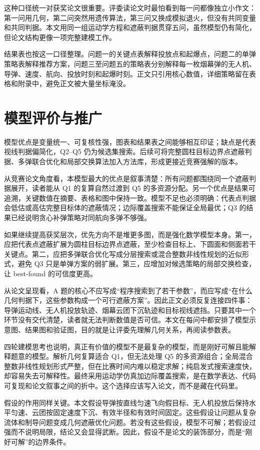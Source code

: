 \documentclass[UTF8,12pt,a4paper]{ctexart}
\begin{document}
这种口径统一对获奖论文很重要。评委读论文时最怕看到每一问都像独立小作文：第一问用几何，第二问突然用遗传算法，第三问又换成模拟退火，但没有共同变量和共同判据。本文用同一组运动学方程和遮蔽判据贯穿五问，虽然模型仍有简化，但论文结构更像一项完整建模工作。

结果表也按这一口径整理。问题一的关键点表解释投放点和起爆点，问题二的单弹策略表解释推荐方案，问题三至问题五的策略表分别解释每一枚烟幕弹的无人机、导弹、速度、航向、投放时刻和起爆时刻。正文只引用核心数值，详细策略留在表格和附录中，避免正文被大量坐标淹没。

\section{模型评价与推广}

模型优点是变量统一、可复核性强，图表和结果表之间能够相互印证；缺点是代表视线判据偏简化，Q2--Q5 仍为候选集搜索。后续可将完整圆柱目标边界点遮蔽判据、多弹联合优化和局部交换算法加入方法库，形成更接近竞赛强解的版本。

从竞赛论文角度看，本模型最大的优点是叙事清楚：所有问题都围绕同一个遮蔽判据展开，读者能从 Q1 的复算自然过渡到 Q5 的多资源分配。另一个优点是结果可追溯，关键数值在摘要、表格和图中保持一致。模型不足也必须明确：代表点判据会低估或高估完整目标体的遮蔽情况；边际覆盖搜索不能保证全局最优；Q3 的结果已经说明贪心补弹策略对同航向多弹不够强。

如果继续提高获奖层次，优先方向不是堆更多图，而是强化数学模型本身。第一，应把代表点遮蔽扩展为圆柱目标边界点遮蔽，至少检查目标上、下圆面和侧面若干关键点。第二，应把多弹联合优化写成分层搜索或混合整数非线性规划的近似形式，避免 Q3 只是单弹方案的弱扩展。第三，应增加对候选策略的局部交换检查，让 best-found 的可信度更高。

从论文呈现看，A 题的核心不应写成“程序搜索到了若干参数”，而应写成“在什么几何判据下，这些参数构成一个可行遮蔽方案”。因此正文必须反复连接四件事：导弹运动线、无人机投放轨迹、烟幕云团下沉轨迹和目标视线遮挡。只要其中一个环节没有交代清楚，读者就无法判断数值是否可信。本文在每问中都安排了模型示意图、结果图和验证图，目的就是让评委先理解几何关系，再阅读参数表。

四轮建模思考也说明，真正有价值的模型不是最复杂的模型，而是刚好可解且能解释题意的模型。解析几何复算适合 Q1，但无法处理 Q5 的多资源组合；全局混合整数非线性规划形式严整，但在比赛时间内难以稳定求解；纯启发式搜索速度快，却容易失去可解释性。最终采用运动学仿真加边际覆盖搜索，是在数学表达、代码可复现和论文叙事之间的折中。这个选择应该写入论文，而不是藏在代码里。

假设的作用同样关键。本文假设导弹按直线匀速飞向假目标、无人机投放后保持水平匀速、云团按固定速度下沉、有效半径和有效时间固定。这些假设让问题从复杂流体和制导问题变成几何遮蔽优化问题。若没有这些假设，模型不可解；若假设过强而不说明局限，结论又会显得武断。因此，假设不是论文的装饰部分，而是“刚好可解”的边界条件。
\end{document}
